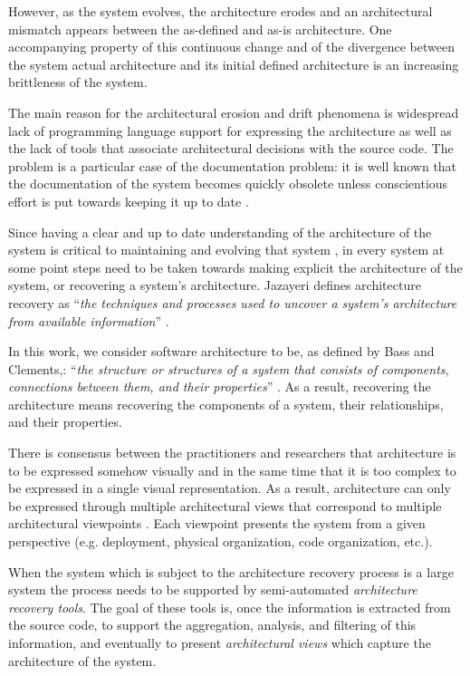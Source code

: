 \documentclass[preprint,12pt]{elsarticle}
\begin{document}
However, as the system evolves, the architecture erodes \cite{perry-foundations} and an architectural mismatch \cite{garlan-mismatch} appears between the as-defined and as-is architecture. One accompanying property of this continuous change and of the divergence between the system actual architecture and its initial defined architecture is an increasing brittleness of the system\cite{perry-foundations}.

The main reason for the architectural erosion and drift phenomena is widespread lack of programming language support for expressing the architecture as well as the lack of tools that associate architectural decisions with the source code. The problem is a particular case of the documentation problem: it is well known that the documentation of the system becomes quickly obsolete unless conscientious effort is put towards keeping it up to date \cite{riva-report}.

Since having a clear and up to date understanding of the architecture of the system is critical to maintaining and evolving that system \cite{pollet-sar}, in every system at some point steps need to be taken towards making explicit the architecture of the system, or recovering a system’s architecture. Jazayeri defines architecture recovery as ``{\em the techniques and processes used to uncover a system’s architecture from available information}'' \cite{jaza-archevo}.

In this work, we consider software architecture to be, as defined by Bass and Clements,: ``{\em the structure or structures of a system that consists of components, connections between them, and their properties}'' \cite{bass-architecture}. As a result, recovering the architecture means recovering the components of a system, their relationships, and their properties. 

There is consensus between the practitioners and researchers that architecture is to be expressed somehow visually and in the same time that it is too complex to be expressed in a single visual representation. As a result, architecture can only be expressed through multiple architectural views that correspond to multiple architectural viewpoints \cite{kruchten-4plus}. Each viewpoint presents the system from a given perspective (e.g. deployment, physical organization, code organization, etc.).

When the system which is subject to the architecture recovery process is a large system the process needs to be supported by semi-automated {\em architecture recovery tools}. The goal of these tools is, once the information is extracted from the source code, to support the aggregation, analysis, and filtering of this information, and eventually to present {\em architectural views} which capture the architecture of the system. 
\end{document}
